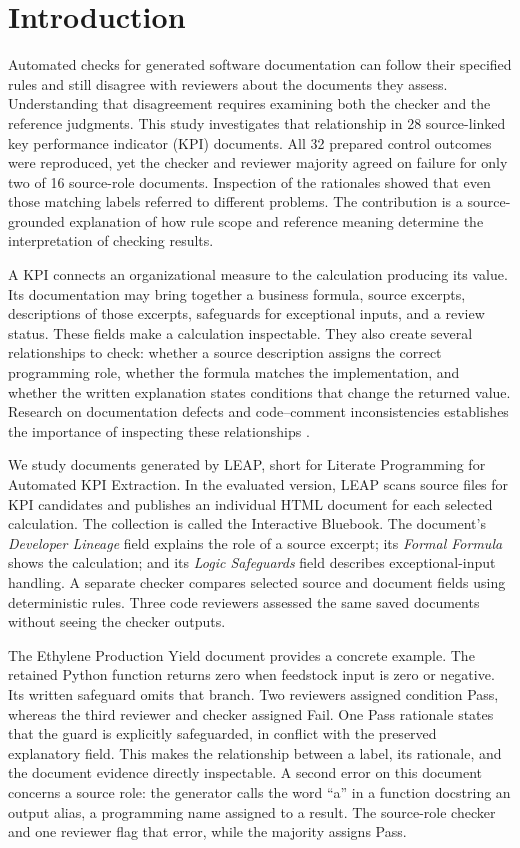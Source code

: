 \documentclass[a4paper,fleqn]{cas-dc}
\begin{document}
\section{Introduction}
Automated checks for generated software documentation can follow their specified rules and still disagree with reviewers about the documents they assess. Understanding that disagreement requires examining both the checker and the reference judgments. This study investigates that relationship in 28 source-linked key performance indicator (KPI) documents. All 32 prepared control outcomes were reproduced, yet the checker and reviewer majority agreed on failure for only two of 16 source-role documents. Inspection of the rationales showed that even those matching labels referred to different problems. The contribution is a source-grounded explanation of how rule scope and reference meaning determine the interpretation of checking results.

A KPI connects an organizational measure to the calculation producing its value. Its documentation may bring together a business formula, source excerpts, descriptions of those excerpts, safeguards for exceptional inputs, and a review status. These fields make a calculation inspectable. They also create several relationships to check: whether a source description assigns the correct programming role, whether the formula matches the implementation, and whether the written explanation states conditions that change the returned value. Research on documentation defects and code--comment inconsistencies establishes the importance of inspecting these relationships \citep{Aghajani2019,Wen2019,Zhou2017}.

We study documents generated by LEAP, short for Literate Programming for Automated KPI Extraction. In the evaluated version, LEAP scans source files for KPI candidates and publishes an individual HTML document for each selected calculation. The collection is called the Interactive Bluebook. The document's \emph{Developer Lineage} field explains the role of a source excerpt; its \emph{Formal Formula} shows the calculation; and its \emph{Logic Safeguards} field describes exceptional-input handling. A separate checker compares selected source and document fields using deterministic rules. Three code reviewers assessed the same saved documents without seeing the checker outputs.

The Ethylene Production Yield document provides a concrete example. The retained Python function returns zero when feedstock input is zero or negative. Its written safeguard omits that branch. Two reviewers assigned condition Pass, whereas the third reviewer and checker assigned Fail. One Pass rationale states that the guard is explicitly safeguarded, in conflict with the preserved explanatory field. This makes the relationship between a label, its rationale, and the document evidence directly inspectable. A second error on this document concerns a source role: the generator calls the word ``a'' in a function docstring an output alias, a programming name assigned to a result. The source-role checker and one reviewer flag that error, while the majority assigns Pass.
\end{document}
